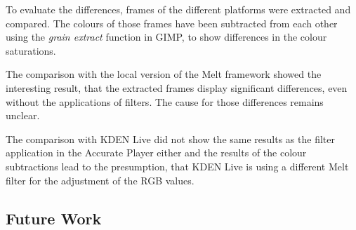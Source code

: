 \documentclass[../MasterThesis.tex]{subfiles}
\begin{document}
To evaluate the differences, frames of the different platforms were extracted and compared. 
The colours of those frames have been subtracted from each other using the \textit{grain extract} function in GIMP, to show differences in the colour saturations.


The comparison with the local version of the Melt framework showed the interesting result, that the extracted frames display significant differences, even without the applications of filters. The cause for those differences remains unclear.

The comparison with KDEN Live did not show the same results as the filter application in the Accurate Player either and the results of the colour subtractions lead to the presumption, that KDEN Live is using a different Melt filter for the adjustment of the RGB values.









	


	

	
	
	
	





\subsection{Future Work} \label{subsection:futurework}
\end{document}
